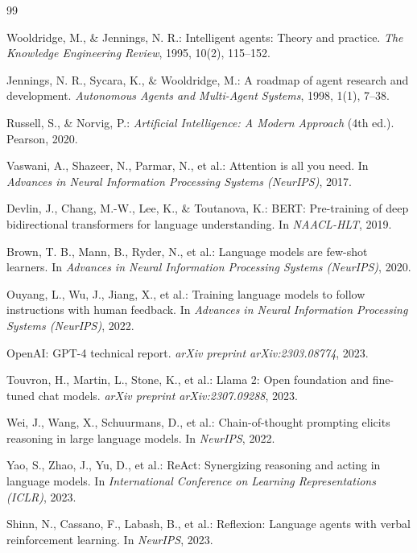 \documentclass[12pt, a4paper]{article}
\begin{document}
\begin{thebibliography}{99}

Wooldridge, M., \& Jennings, N. R.: Intelligent agents: Theory and practice.
\textit{The Knowledge Engineering Review}, 1995, 10(2), 115--152.

Jennings, N. R., Sycara, K., \& Wooldridge, M.: A roadmap of agent research and
development. \textit{Autonomous Agents and Multi-Agent Systems}, 1998, 1(1), 7--38.

Russell, S., \& Norvig, P.: \textit{Artificial Intelligence: A Modern Approach}
(4th ed.). Pearson, 2020.

Vaswani, A., Shazeer, N., Parmar, N., et al.: Attention is all you need.
In \textit{Advances in Neural Information Processing Systems (NeurIPS)}, 2017.

Devlin, J., Chang, M.-W., Lee, K., \& Toutanova, K.: BERT: Pre-training of deep
bidirectional transformers for language understanding. In \textit{NAACL-HLT}, 2019.

Brown, T. B., Mann, B., Ryder, N., et al.: Language models are few-shot learners.
In \textit{Advances in Neural Information Processing Systems (NeurIPS)}, 2020.

Ouyang, L., Wu, J., Jiang, X., et al.: Training language models to follow
instructions with human feedback. In \textit{Advances in Neural Information
Processing Systems (NeurIPS)}, 2022.

OpenAI: GPT-4 technical report. \textit{arXiv preprint arXiv:2303.08774}, 2023.

Touvron, H., Martin, L., Stone, K., et al.: Llama 2: Open foundation and
fine-tuned chat models. \textit{arXiv preprint arXiv:2307.09288}, 2023.

Wei, J., Wang, X., Schuurmans, D., et al.: Chain-of-thought prompting elicits
reasoning in large language models. In \textit{NeurIPS}, 2022.

Yao, S., Zhao, J., Yu, D., et al.: ReAct: Synergizing reasoning and acting in
language models. In \textit{International Conference on Learning Representations
(ICLR)}, 2023.

Shinn, N., Cassano, F., Labash, B., et al.: Reflexion: Language agents with verbal
reinforcement learning. In \textit{NeurIPS}, 2023.


\end{thebibliography}
\end{document}
